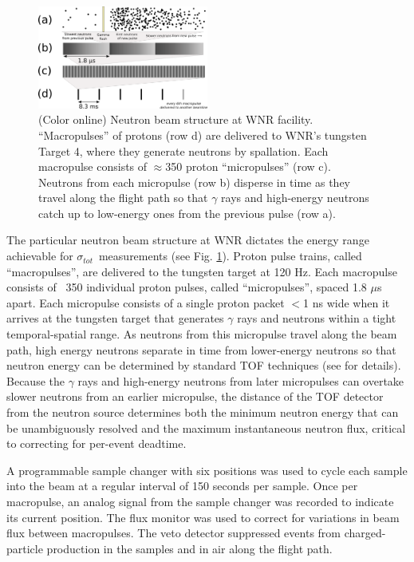 \documentclass[twocolumn,secnumarabic,amssymb, nobibnotes, aps, prl,
superscriptaddress, nobalancelastpage]{revtex4}
\newcommand{\tot}{\ensuremath{\sigma_{tot}}}
\begin{document}
\begin{figure}
    \includegraphics[width=0.5\textwidth]{figures/beamStructure.png}
    \caption{(Color online) Neutron beam structure at WNR facility.
        ``Macropulses'' of protons (row d) are delivered to
        WNR's tungsten Target 4, where they generate neutrons by spallation.
        Each macropulse consists of
        $\approx$350 proton ``micropulses'' (row c). Neutrons
        from each micropulse (row b) disperse in
        time as they travel along the flight path so that $\gamma$ rays and high-energy 
    neutrons catch up to low-energy ones from the previous pulse (row a).}
    \label{BeamStructure}
\end{figure}

The particular neutron beam structure at WNR dictates the energy range
achievable for \tot\ measurements (see Fig. \ref{BeamStructure}).
Proton pulse trains, called ``macropulses'', are delivered to the tungsten target at 120 Hz.
Each macropulse consists of ~350 individual proton pulses, called
``micropulses'', spaced 1.8 
$\mu$s apart. Each micropulse consists of a single proton packet $<$1 ns wide when it 
arrives at the tungsten target that generates $\gamma$ rays and neutrons within a tight
temporal-spatial range. As neutrons from this micropulse travel along the beam path, 
high energy neutrons separate in time from lower-energy neutrons so that neutron
energy can be determined by standard TOF techniques (see \cite{Moore1980} for details).
Because the $\gamma$ rays and high-energy neutrons from later micropulses can
overtake slower neutrons from an earlier micropulse, the distance of the TOF
detector from the neutron source determines both the minimum neutron energy that can be 
unambiguously resolved and the maximum instantaneous neutron flux, critical to correcting
for per-event deadtime.

A programmable sample changer with six positions
was used to cycle each sample into the beam at a regular interval of 150 seconds 
per sample. Once per macropulse, an analog signal from the sample changer
was recorded to indicate its current position.
The flux monitor was used to correct for variations in beam flux between 
macropulses. The veto detector suppressed events from charged-particle production 
in the samples and in air along the flight path.
\end{document}
